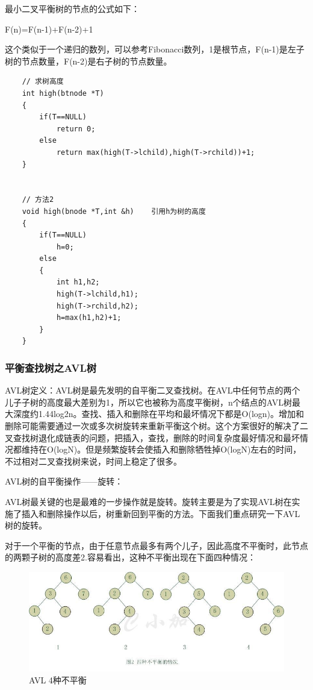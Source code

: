 \documentclass[UTF8,a4paper,12pt]{ctexbook}
\begin{document}
		最小二叉平衡树的节点的公式如下：
		
		F(n)=F(n-1)+F(n-2)+1
		
		这个类似于一个递归的数列，可以参考Fibonacci数列，1是根节点，F(n-1)是左子树的节点数量，F(n-2)是右子树的节点数量。
		\begin{lstlisting}
	// 求树高度
	int high(btnode *T)  
	{  
		if(T==NULL)  
			return 0;  
		else  
			return max(high(T->lchild),high(T->rchild))+1;  
	}  
	
	
	// 方法2
	void high(bnode *T,int &h)    引用h为树的高度  
	{  
		if(T==NULL)  
			h=0;  
		else  
		{  
			int h1,h2;  
			high(T->lchild,h1);  
			high(T->rchild,h2);  
			h=max(h1,h2)+1;  
		}  
	}  
		\end{lstlisting}
		
		\subsubsection{平衡查找树之AVL树}
			AVL树定义：AVL树是最先发明的自平衡二叉查找树。在AVL中任何节点的两个儿子子树的高度最大差别为1，所以它也被称为高度平衡树，n个结点的AVL树最大深度约1.44log2n。查找、插入和删除在平均和最坏情况下都是O(logn)。增加和删除可能需要通过一次或多次树旋转来重新平衡这个树。这个方案很好的解决了二叉查找树退化成链表的问题，把插入，查找，删除的时间复杂度最好情况和最坏情况都维持在O(logN)。但是频繁旋转会使插入和删除牺牲掉O(logN)左右的时间，不过相对二叉查找树来说，时间上稳定了很多。
			
			AVL树的自平衡操作——旋转：
			
			AVL树最关键的也是最难的一步操作就是旋转。旋转主要是为了实现AVL树在实施了插入和删除操作以后，树重新回到平衡的方法。下面我们重点研究一下AVL树的旋转。
			
			对于一个平衡的节点，由于任意节点最多有两个儿子，因此高度不平衡时，此节点的两颗子树的高度差2.容易看出，这种不平衡出现在下面四种情况：
			\begin{figure}[h]
				\centering
				\includegraphics[scale = 0.8]{AVL.jpg}
				\caption{AVL 4种不平衡}
				\label{AVL}
			\end{figure}
				
\end{document}
